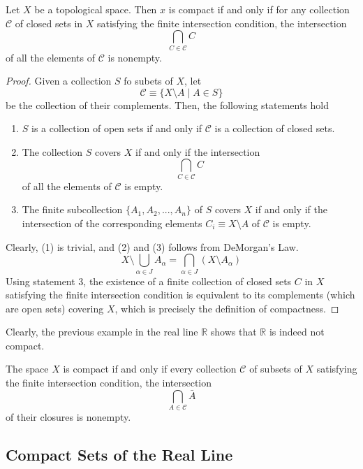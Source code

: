     \begin{theorem}
    Let $X$ be a topological space. Then $x$ is compact if and only if for any collection $\mathcal{C}$ of closed sets in $X$ satisfying the finite intersection condition, the intersection 
    \[\bigcap_{C \in \mathcal{C}} C\]
    of all the elements of $\mathcal{C}$ is nonempty. 
    \end{theorem}
    \begin{proof}
    Given a collection $S$ fo subets of $X$, let 
    \[\mathcal{C} \equiv \{X \setminus A \; | \; A \in S\}\]
    be the collection of their complements. Then, the following statements hold 
    \begin{enumerate}
        \item $S$ is a collection of open sets if and only if $\mathcal{C}$ is a collection of closed sets. 
        \item The collection $S$ covers $X$ if and only if the intersection 
        \[\bigcap_{C \in \mathcal{C}} C\]
        of all the elements of $\mathcal{C}$ is empty. 
        \item The finite subcollection $\{A_1, A_2, ..., A_n\}$ of $S$ covers $X$ if and only if the intersection of the corresponding elements $C_i \equiv X \setminus A$ of $\mathcal{C}$ is empty. 
    \end{enumerate}
    Clearly, (1) is trivial, and (2) and (3) follows from DeMorgan's Law. 
    \[X \setminus \bigcup_{\alpha \in J} A_\alpha = \bigcap_{\alpha \in J} (X \setminus A_\alpha)\]
    Using statement 3, the existence of a finite collection of closed sets $C$ in $X$ satisfying the finite intersection condition is equivalent to its complements (which are open sets) covering $X$, which is precisely the definition of compactness. 
    \end{proof}

    Clearly, the previous example in the real line $\mathbb{R}$ shows that $\mathbb{R}$ is indeed not compact. 

    \begin{corollary}
    The space $X$ is compact if and only if every collection $\mathscr{C}$ of subsets of $X$ satisfying the finite intersection condition, the intersection 
    \[\bigcap_{A \in \mathscr{C}} \bar{A}\]
    of their closures is nonempty. 
    \end{corollary}

  \subsection{Compact Sets of the Real Line}

